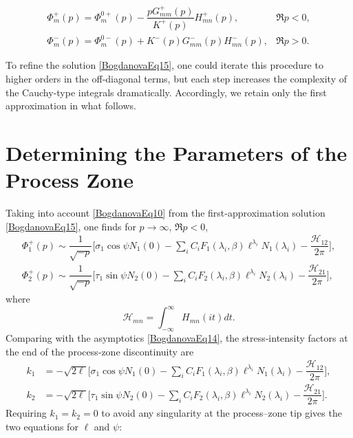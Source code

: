 \begin{equation}\label{BogdanovaEq15}
	\begin{array}{ll}
		\Phi_{m}^{+}(p)
		=\Phi_{m}^{0+}(p)
		-\dfrac{pG_{mm}^{+}(p)}{K^{+}(p)}H_{mn}^{+}(p), &
		\Re p<0,
		\\
		\Phi_{m}^{-}(p)
		=\Phi_{m}^{0-}(p)
		+K^{-}(p)G_{mm}^{-}(p)H_{mn}^{-}(p), &
		\Re p>0.
	\end{array}
\end{equation}


To refine the solution \eqref{BogdanovaEq15}, one could iterate this procedure to higher orders in the off‐diagonal terms, but each step increases the complexity of the Cauchy‐type integrals dramatically.  Accordingly, we retain only the first approximation in what follows.

\section{Determining the Parameters of the Process Zone}
\label{BogdanovaSec4}

Taking into account \eqref{BogdanovaEq10} from the first‐approximation solution \eqref{BogdanovaEq15}, one finds for \(p\to\infty\), \(\Re p<0\),
\[
\begin{array}{ll}
	\Phi_{1}^{+}(p)\sim \dfrac{1}{\sqrt{-p}}\biggl[
\sigma_{1}\cos\psi N_{1}(0)
-\sum_{i}C_{i}F_{1}(\lambda_{i},\beta)\ell^{\lambda_{i}}N_{1}(\lambda_{i})
-\dfrac{\mathcal{H}_{12}}{2\pi}
\biggr],
\\
\Phi_{2}^{+}(p)\sim \dfrac{1}{\sqrt{-p}}\biggl[
\tau_{1}\sin\psi N_{2}(0)
-\sum_{i}C_{i}F_{2}(\lambda_{i},\beta)\ell^{\lambda_{i}}N_{2}(\lambda_{i})
-\dfrac{\mathcal{H}_{21}}{2\pi}
\biggr],
\end{array}
\]
where
\[
\mathcal{H}_{mn}=\int_{-\infty}^{\infty}H_{mn}(i t) dt.
\]
Comparing with the asymptotics \eqref{BogdanovaEq14}, the stress‐intensity factors at the end of the process‐zone discontinuity are
\begin{equation*}
	\begin{array}{ll}
		k_{1}
		&=-\sqrt{2\ell}\biggl[
		\sigma_{1}\cos\psi N_{1}(0)
		-\displaystyle\sum_{i}C_{i}F_{1}(\lambda_{i},\beta)\ell^{\lambda_{i}}N_{1}(\lambda_{i})
		-\dfrac{\mathcal{H}_{12}}{2\pi}
		\biggr],\\
		k_{2}
		&=-\sqrt{2\ell}\biggl[
		\tau_{1}\sin\psi N_{2}(0)
		-\displaystyle\sum_{i}C_{i}F_{2}(\lambda_{i},\beta)\ell^{\lambda_{i}}N_{2}(\lambda_{i})
		-\dfrac{\mathcal{H}_{21}}{2\pi}
		\biggr].
	\end{array}
\end{equation*}
Requiring \(k_{1}=k_{2}=0\) to avoid any singularity at the process–zone tip gives the two equations for \(\ell\) and \(\psi\):

